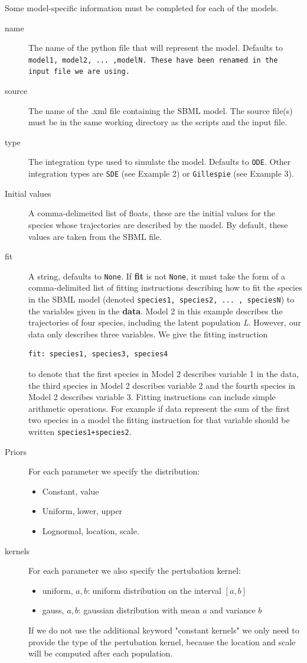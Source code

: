\documentclass[a4paper]{report}
\begin{document}
Some model-specific information must be completed for each of the models.
\begin{description}
\item[name] The name of the python file that will represent the model. Defaults to \tt model1\rm, \tt model2\rm, ... ,\tt modelN\rm.  These have been renamed in the input file we are using.
\item[source] The name of the .xml file containing the SBML model. The source file(s) must be in the same working directory as the scripts and the input file.
\item[type] The integration type used to simulate the model. Defaults to \verb$ODE$. Other integration types are \verb$SDE$ (see Example 2) or \verb$Gillespie$ (see Example 3).
\item[Initial values] A comma-delimeited list of floats, these are the initial values for the species whose trajectories are described by the model. By default, these values are taken from the SBML file.
\item[fit] A string, defaults to \verb$None$. If \textbf{fit} is not \verb$None$, it must take the form of a comma-delimited list of fitting instructions describing how to fit the species in the SBML model (denoted \verb$species1, species2, ... , speciesN$) to the variables given in the \textbf{data}. Model 2 in this example describes the trajectories of four species, including the latent population \emph{L}. However, our data only describes three variables.  We give the fitting instruction
\begin{verbatim}
fit: species1, species3, species4
\end{verbatim}
to denote that the first species in Model 2 describes variable 1 in the data, the third species in Model 2 describes variable 2 and the fourth species in Model 2 describes variable 3. Fitting instructions can include simple arithmetic operations. For example if data represent the sum of the first two species in a model the fitting instruction for that variable should be written \verb$species1+species2$. 
 \item[Priors] For each parameter we specify the distribution:
\begin{itemize}
\item Constant, value
\item Uniform, lower, upper
\item Lognormal, location, scale.
\end{itemize}
\item[kernels]  For each parameter we also specify the pertubation kernel:
\begin{itemize}
\item uniform, $a, b$: uniform distribution on the interval $[a, b]$
\item gauss, $a, b$: gaussian distribution with mean $a$ and variance $b$
\end{itemize}
If we do not use the additional keyword "constant kernels" we only need to provide the type of the pertubation kernel, because the location and scale will be computed after each population. 
\end{description}
\end{document}

